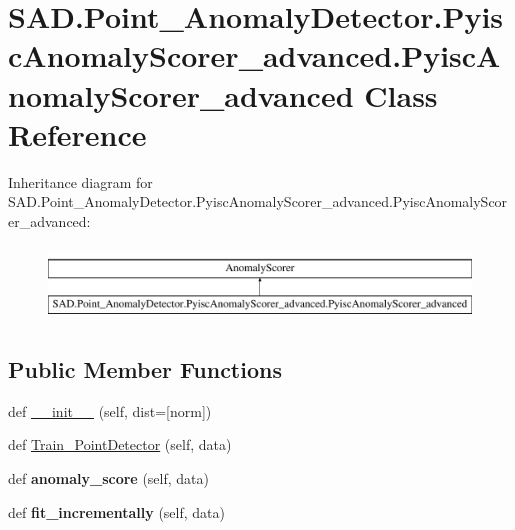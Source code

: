 \hypertarget{classSAD_1_1Point__AnomalyDetector_1_1PyiscAnomalyScorer__advanced_1_1PyiscAnomalyScorer__advanced}{}\section{S\+A\+D.\+Point\+\_\+\+Anomaly\+Detector.\+Pyisc\+Anomaly\+Scorer\+\_\+advanced.\+Pyisc\+Anomaly\+Scorer\+\_\+advanced Class Reference}
\label{classSAD_1_1Point__AnomalyDetector_1_1PyiscAnomalyScorer__advanced_1_1PyiscAnomalyScorer__advanced}
Inheritance diagram for S\+A\+D.\+Point\+\_\+\+Anomaly\+Detector.\+Pyisc\+Anomaly\+Scorer\+\_\+advanced.\+Pyisc\+Anomaly\+Scorer\+\_\+advanced\+:\begin{figure}[H]
\begin{center}
\leavevmode
\includegraphics[height=2.000000cm]{classSAD_1_1Point__AnomalyDetector_1_1PyiscAnomalyScorer__advanced_1_1PyiscAnomalyScorer__advanced}
\end{center}
\end{figure}
\subsection*{Public Member Functions}
\begin{DoxyCompactItemize}
\item 
def \hyperlink{classSAD_1_1Point__AnomalyDetector_1_1PyiscAnomalyScorer__advanced_1_1PyiscAnomalyScorer__advanced_a0f31a799a55ffef102c814a436661d10}{\+\_\+\+\_\+init\+\_\+\+\_\+} (self, dist=\mbox{[}\textquotesingle{}norm\textquotesingle{}\mbox{]})
\item 
def \hyperlink{classSAD_1_1Point__AnomalyDetector_1_1PyiscAnomalyScorer__advanced_1_1PyiscAnomalyScorer__advanced_aef70b902dc9c5df150eecd5c0b1c3916}{Train\+\_\+\+Point\+Detector} (self, data)
\item 
def {\bfseries anomaly\+\_\+score} (self, data)\hypertarget{classSAD_1_1Point__AnomalyDetector_1_1PyiscAnomalyScorer__advanced_1_1PyiscAnomalyScorer__advanced_a751634890dab90cda33cb0c9957981eb}{}\label{classSAD_1_1Point__AnomalyDetector_1_1PyiscAnomalyScorer__advanced_1_1PyiscAnomalyScorer__advanced_a751634890dab90cda33cb0c9957981eb}

\item 
def {\bfseries fit\+\_\+incrementally} (self, data)\hypertarget{classSAD_1_1Point__AnomalyDetector_1_1PyiscAnomalyScorer__advanced_1_1PyiscAnomalyScorer__advanced_a52a3c0edbbe5e46d9313fcf32ea1f1bc}{}\label{classSAD_1_1Point__AnomalyDetector_1_1PyiscAnomalyScorer__advanced_1_1PyiscAnomalyScorer__advanced_a52a3c0edbbe5e46d9313fcf32ea1f1bc}

\end{DoxyCompactItemize}
